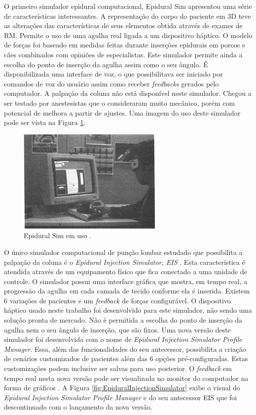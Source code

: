 O primeiro simulador epidural computacional, Epidural Sim \cite{Stredney1996} apresentou uma série de características interessantes. A representação do corpo do paciente em 3D teve as alterações das características de seus elementos obtida através de exames de \acrfull{RM}. Permite o uso de uma agulha real ligada a um dispositivo háptico. O modelo de forças foi baseado em medidas feitas durante inserções epidurais em porcos e cães combinados com opiniões de especialistas. Este simulador permite ainda a escolha do ponto de inserção da agulha assim como o seu ângulo. É disponibilizada uma interface de voz, o que possibilitava ser iniciado por comandos de voz do usuário assim como receber \textit{feedbacks} gerados pelo computador. A palpação da coluna não está disponível neste simulador. Chegou a ser testado por anestesistas que o consideraram muito mecânico, porém com potencial de melhora a partir de ajustes. Uma imagem do uso deste simulador pode ser vista na Figura \ref{fig:epiduralSim}. 

\begin{figure}[ht!]
    \centering
    \includegraphics[width=0.3\linewidth]{capitulos/figuras/epiduralSimulator.png} 
    \caption{Epidural Sim em uso \cite{Stredney1996}.}
    \label{fig:epiduralSim}
\end{figure}

O único simulador computacional de punção lombar estudado que possibilita a palpação da coluna é o \textit{Epidural Injection Simulator, EIS} \cite{Wilson2003}. Esta característica é atendida através de um equipamento físico que fica conectado a uma unidade de controle. O simulador possui uma interface gráfica que mostra, em tempo real, a progressão da agulha em cada camada de tecido conforme ela é inserida. Existem 6 variações de pacientes e um \textit{feedback} de forças configurável. O dispositivo háptico usado neste trabalho foi desenvolvido para este simulador, não sendo uma solução pronta de mercado. Não é permitida a escolha do ponto de inserção da agulha nem o seu ângulo de inserção, que são fixos. Uma nova versão deste simulador foi desenvolvida com o nome de \textit{Epidural Injection Simulator Profile Manager}. Essa, além das funcionalidades do seu antecessor, possibilita a criação de cenários customizados de pacientes além das 6 opções pré-configuradas. Estas customizações podem inclusive ser salvas para uso posterior. O \textit{feedback} em tempo real nesta nova versão pode ser visualizada no monitor do computador na forma de gráficos \cite{CPRSavers&FirstAidSupply2018}. A Figura \ref{fig:EpiduralInjectionSimulator} exibe o visual do \textit{Epidural Injection Simulator Profile Manager} e do seu antecessor EIS que foi descontinuado com o lançamento da nova versão.

